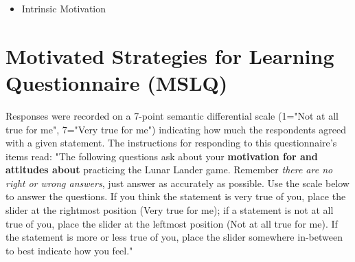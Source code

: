 \begin{subappendices}
\begin{itemize}
    \item Intrinsic Motivation
\end{itemize}

\section{Motivated Strategies for Learning Questionnaire (MSLQ)} Responses were recorded on a 7-point semantic differential scale (1="Not at all true for me", 7="Very true for me") indicating how much the respondents agreed with a given statement. The instructions for responding to this questionnaire's items read: "The following questions ask about your \textbf{motivation for and attitudes about} practicing the Lunar Lander game. Remember \textit{there are no right or wrong answers}, just answer as accurately as possible. Use the scale below to answer the questions. If you think the statement is very true of you, place the slider at the rightmost position (Very true for me); if a statement is not at all true of you, place the slider at the leftmost position (Not at all true for me). If the statement is more or less true of you, place the slider somewhere in-between to best indicate how you feel."


\end{subappendices}
